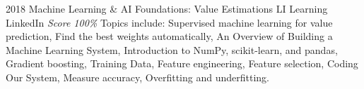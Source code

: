 \documentclass[11pt,a4paper]{moderncv}
\begin{document}
\cventry
    {2018}
    {Machine Learning \& AI Foundations: Value Estimations}
    {LI Learning}
    {LinkedIn}
    {\textit{Score 100\%}}
    {
        Topics include:                                                          %
            Supervised machine learning for value prediction,                                                          %
            Find the best weights automatically,                                                          %
            An Overview of Building a Machine Learning System,                                                          %
            Introduction to NumPy, scikit-learn, and pandas,                                                          %
            Gradient boosting,                                                          %
            Training Data,                                                          %
            Feature engineering,                                                          %
            Feature selection,                                                          %
            Coding Our System,                                                          %
            Measure accuracy,                                                          %
            Overfitting and underfitting.                                                          %
    }
\end{document}
